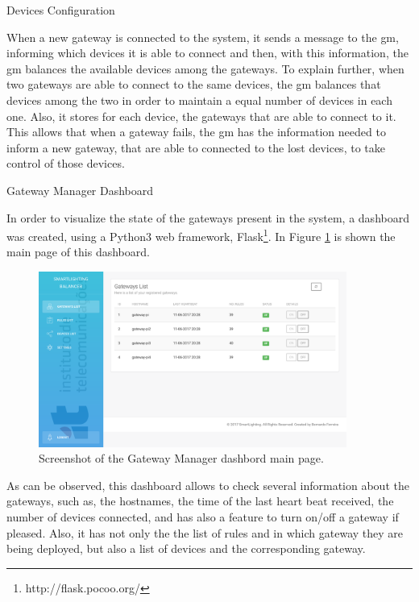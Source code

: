 \begin{Paragraph}{Devices Configuration}

When a new gateway is connected to the system, it sends a message to the \ac{gm}, informing which devices it is able to connect and then, with this information, the \ac{gm} balances the available devices among the gateways. To explain further, when two gateways are able to connect to the same devices, the \ac{gm} balances that devices among the two in order to maintain a equal number of devices in each one. Also, it stores for each device, the gateways that are able to connect to it. This allows that when a gateway fails, the \ac{gm} has the information needed to inform a new gateway, that are able to connected to the lost devices, to take control of those devices.

\end{Paragraph}

\begin{Paragraph}{Gateway Manager Dashboard}

In order to visualize the state of the gateways present in the system, a dashboard was created, using a Python3 web framework, Flask\footnote{http://flask.pocoo.org/}. In Figure \ref{fig:main_gm} is shown the main page of this dashboard.

\begin{figure}[H]
	\centering
	\includegraphics[width=0.9\textwidth]{figures/main_gm.png}
	\caption{Screenshot of the Gateway Manager dashbord main page.}
	\label{fig:main_gm}
\end{figure}

As can be observed, this dashboard allows to check several information about the gateways, such as, the hostnames, the time of the last heart beat received, the number of devices connected, and has also a feature to turn on/off a gateway if pleased. Also, it has not only the the list of rules and in which gateway they are being deployed, but also a list of devices and the corresponding gateway.


\end{Paragraph}

